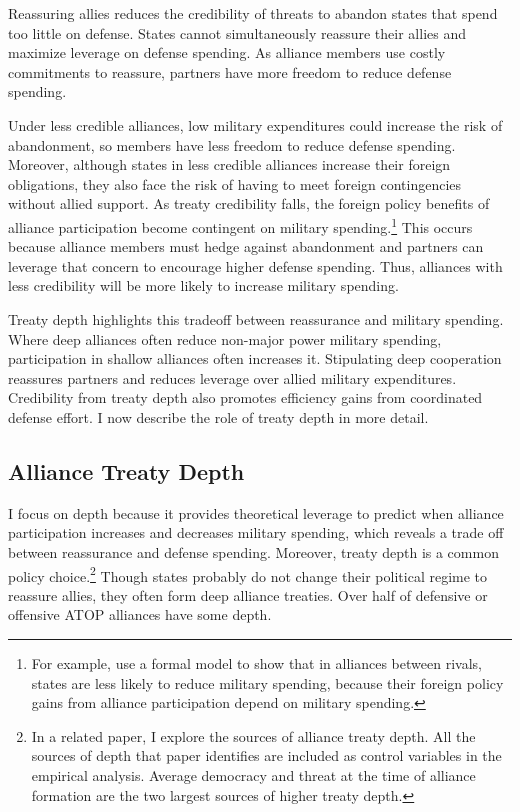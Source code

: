 \documentclass[12pt]{article}
\begin{document}
Reassuring allies reduces the credibility of threats to abandon states that spend too little on defense. 
States cannot simultaneously reassure their allies and maximize leverage on defense spending. 
As alliance members use costly commitments to reassure, partners have more freedom to reduce defense spending. 


Under less credible alliances, low military expenditures could increase the risk of abandonment, so members have less freedom to reduce defense spending. 
Moreover, although states in less credible alliances increase their foreign obligations, they also face the risk of having to meet foreign contingencies without allied support. 
As treaty credibility falls, the foreign policy benefits of alliance participation become contingent on military spending.\footnote{For example, \citep{NiouZeigler2019} use a formal model to show that in alliances between rivals, states are less likely to reduce military spending, because their foreign policy gains from alliance participation depend on military spending.} 
This occurs because alliance members must hedge against abandonment and partners can leverage that concern to encourage higher defense spending.
Thus, alliances with less credibility will be more likely to increase military spending. 


Treaty depth highlights this tradeoff between reassurance and military spending.
Where deep alliances often reduce non-major power military spending, participation in shallow alliances often increases it. 
Stipulating deep cooperation reassures partners and reduces leverage over allied military expenditures. 
Credibility from treaty depth also promotes efficiency gains from coordinated defense effort. 
I now describe the role of treaty depth in more detail. 



\subsection{Alliance Treaty Depth} 


I focus on depth because it provides theoretical leverage to predict when alliance participation increases and decreases military spending, which reveals a trade off between reassurance and defense spending.  
Moreover, treaty depth is a common policy choice.\footnote{In a related paper, I explore the sources of alliance treaty depth. All the sources of depth that paper identifies are included as control variables in the empirical analysis. Average democracy and threat at the time of alliance formation are the two largest sources of higher treaty depth.} 
Though states probably do not change their political regime to reassure allies, they often form deep alliance treaties. 
Over half of defensive or offensive ATOP alliances have some depth. 
\end{document}
